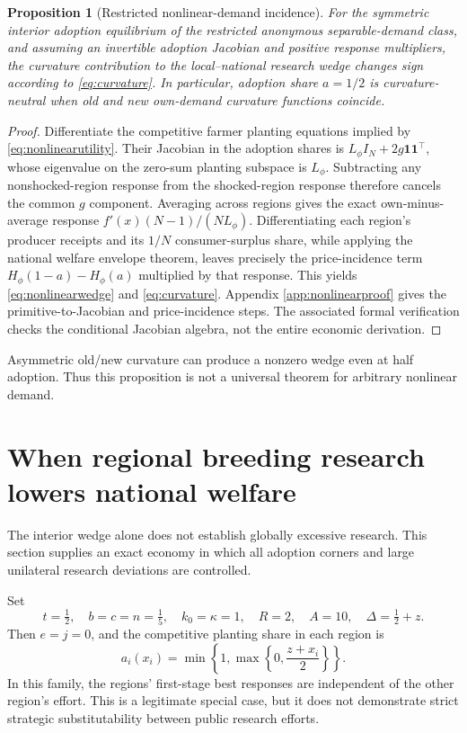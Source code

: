 \documentclass[11pt,a4paper]{article}
\newtheorem{proposition}{Proposition}
\begin{document}
\begin{proposition}[Restricted nonlinear-demand incidence]
For the symmetric interior adoption equilibrium of the restricted anonymous separable-demand class, and assuming an invertible adoption Jacobian and positive response multipliers, the curvature contribution to the local--national research wedge changes sign according to \eqref{eq:curvature}. In particular, adoption share $a=1/2$ is curvature-neutral when old and new own-demand curvature functions coincide.
\end{proposition}
\begin{proof}
Differentiate the competitive farmer planting equations implied by \eqref{eq:nonlinearutility}. Their Jacobian in the adoption shares is $L_\phi I_N+2g\mathbf1\mathbf1^\top$, whose eigenvalue on the zero-sum planting subspace is $L_\phi$. Subtracting any nonshocked-region response from the shocked-region response therefore cancels the common $g$ component. Averaging across regions gives the exact own-minus-average response $f'(x)(N-1)/(NL_\phi)$. Differentiating each region's producer receipts and its $1/N$ consumer-surplus share, while applying the national welfare envelope theorem, leaves precisely the price-incidence term $H_\phi(1-a)-H_\phi(a)$ multiplied by that response. This yields \eqref{eq:nonlinearwedge} and \eqref{eq:curvature}. Appendix \ref{app:nonlinearproof} gives the primitive-to-Jacobian and price-incidence steps. The associated formal verification checks the conditional Jacobian algebra, not the entire economic derivation.
\end{proof}
Asymmetric old/new curvature can produce a nonzero wedge even at half adoption. Thus this proposition is not a universal theorem for arbitrary nonlinear demand.

\section{When regional breeding research lowers national welfare}
The interior wedge alone does not establish globally excessive research. This section supplies an exact economy in which all adoption corners and large unilateral research deviations are controlled.

Set
\begin{equation}
 t=\tfrac12,\quad b=c=n=\tfrac15,\quad
 k_0=\kappa=1,\quad R=2,\quad A=10,\quad
 \Delta=\tfrac12+z.
 \label{eq:family}
\end{equation}
Then $e=j=0$, and the competitive planting share in each region is
\begin{equation}
 a_i(x_i)=\min\left\{1,\max\left\{0,\frac{z+x_i}{2}\right\}\right\}.
 \label{eq:clamp}
\end{equation}
In this family, the regions' first-stage best responses are independent of the other region's effort. This is a legitimate special case, but it does not demonstrate strict strategic substitutability between public research efforts.
\end{document}

